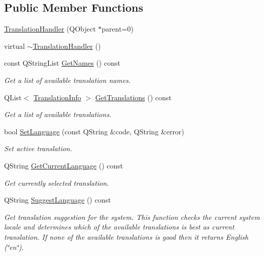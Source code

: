 \subsection*{Public Member Functions}
\begin{DoxyCompactItemize}
\item 
\hyperlink{class_translation_handler_a37636fc0605dafe154594b4a20b1c34b}{Translation\-Handler} (Q\-Object $\ast$parent=0)
\item 
virtual \hyperlink{class_translation_handler_acd7d9f74fb9171850f940bd83fd1e40d}{$\sim$\-Translation\-Handler} ()
\item 
const Q\-String\-List \hyperlink{class_translation_handler_a886e287c10961665d5c3bede8be1d886}{Get\-Names} () const 
\begin{DoxyCompactList}\small\item\em Get a list of available translation names. \end{DoxyCompactList}\item 
Q\-List$<$ \hyperlink{struct_translation_info}{Translation\-Info} $>$ \hyperlink{class_translation_handler_af2e56511e86488463a14fe515fcd01a2}{Get\-Translations} () const 
\begin{DoxyCompactList}\small\item\em Get a list of available translations. \end{DoxyCompactList}\item 
bool \hyperlink{class_translation_handler_ac38e411064467360006817f57c5897f2}{Set\-Language} (const Q\-String \&code, Q\-String \&error)
\begin{DoxyCompactList}\small\item\em Set active translation. \end{DoxyCompactList}\item 
Q\-String \hyperlink{class_translation_handler_a4aaca1c4faf95b0616678a1100e086d3}{Get\-Current\-Language} () const 
\begin{DoxyCompactList}\small\item\em Get currently selected translation. \end{DoxyCompactList}\item 
Q\-String \hyperlink{class_translation_handler_a50d0baf26823cc1f05daf4cc4527631b}{Suggest\-Language} () const 
\begin{DoxyCompactList}\small\item\em Get translation suggestion for the system. This function checks the current system locale and determines which of the available translations is best as current translation. If none of the available translations is good then it returns English (\char`\"{}en\char`\"{}). \end{DoxyCompactList}\end{DoxyCompactItemize}

